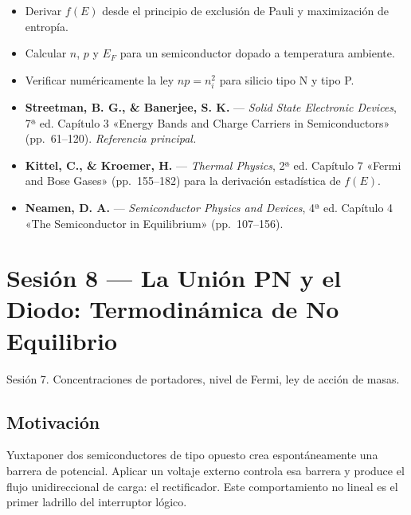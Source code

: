 \documentclass[11pt, letterpaper]{article}
\begin{document}
\begin{objetivos}
\begin{itemize}
  \item Derivar $f(E)$ desde el principio de exclusión de Pauli y maximización de entropía.
  \item Calcular $n$, $p$ y $E_F$ para un semiconductor dopado a temperatura ambiente.
  \item Verificar numéricamente la ley $np=n_i^2$ para silicio tipo N y tipo P.
\end{itemize}
\end{objetivos}

\begin{lecturas}
\begin{itemize}
  \item[$(\star)$] \textbf{Streetman, B. G., \& Banerjee, S. K.} — \emph{Solid State Electronic Devices}, 7ª ed. Capítulo 3 «Energy Bands and Charge Carriers in Semiconductors» (pp.\ 61--120). \textit{Referencia principal.}
  \item[$(\star)$] \textbf{Kittel, C., \& Kroemer, H.} — \emph{Thermal Physics}, 2ª ed. Capítulo 7 «Fermi and Bose Gases» (pp.\ 155--182) para la derivación estadística de $f(E)$.
  \item \textbf{Neamen, D. A.} — \emph{Semiconductor Physics and Devices}, 4ª ed. Capítulo 4 «The Semiconductor in Equilibrium» (pp.\ 107--156).
\end{itemize}
\end{lecturas}

\newpage

\section{Sesión 8 — La Unión PN y el Diodo: Termodinámica de No Equilibrio}

\begin{prereqs}
Sesión 7. Concentraciones de portadores, nivel de Fermi, ley de acción de masas.
\end{prereqs}

\subsection*{Motivación}
Yuxtaponer dos semiconductores de tipo opuesto crea espontáneamente una barrera de potencial. Aplicar un voltaje externo controla esa barrera y produce el flujo unidireccional de carga: el rectificador. Este comportamiento no lineal es el primer ladrillo del interruptor lógico.
\end{document}
